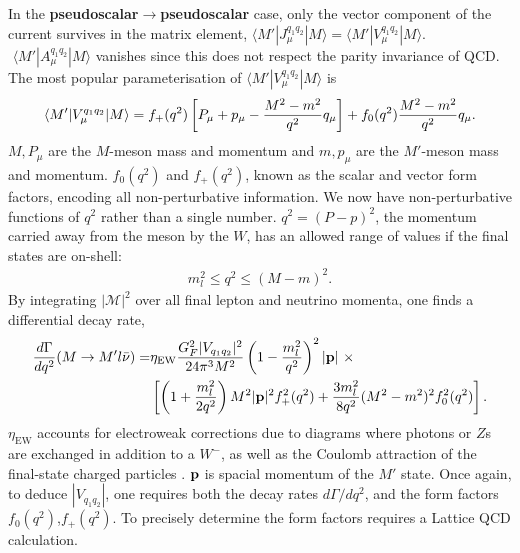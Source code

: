 In the {\bf{pseudoscalar$\to$pseudoscalar}} case, only the vector component of the current survives in the matrix element, $\langle M' | J_{\mu}^{q_1q_2} | M \rangle = \langle M' | V_{\mu}^{q_1q_2} | M \rangle$. $\,\,\langle M' | A_{\mu}^{q_1q_2} | M \rangle$ vanishes since this does not respect the parity invariance of QCD. The most popular parameterisation of $\langle M' | V_{\mu}^{q_1q_2} | M \rangle$ is
\begin{align}
  \langle M' | V_{\mu}^{q_1q_2} | M \rangle = f_+(q^2) \left[ P_{\mu} + p_{\mu} - {M^2-m^2\over q^2} q_{\mu} \right]  + f_0(q^2) {M^2-m^2\over q^2} q_{\mu}.
  \label{eq:formfactors_experimental}
\end{align}
$M,P_{\mu}$ are the $M$-meson mass and momentum and $m,p_{\mu}$ are the $M'$-meson mass and momentum. $f_0(q^2)$ and $f_+(q^2)$, known as the scalar and vector form factors, encoding all non-perturbative information. We now have non-perturbative functions of $q^2$ rather than a single number. $q^2=(P-p)^2$, the momentum carried away from the meson by the $W$, has an allowed range of values if the final states are on-shell:
\begin{align}
  m_l^2 \leq q^2 \leq (M-m)^2.
\end{align}
By integrating $|\mathcal{M}|^2$ over all final lepton and neutrino momenta, one finds a differential decay rate,
\begin{align}
  {d\Gamma\over dq^2}(M\to M'l\bar{\nu}) =& \eta_{\text{EW}} { G_F^2 |V_{q_1q_2}|^2\over 24 \pi^3 M^2 } \left( 1 - {m_l^2\over q^2}\right)^2 |{\bf{p}}| \,\,\times \\
  \label{eq:branchingfraction}
  &\left[ \left( 1 + {m_l^2\over 2q^2}\right) M^2 |{\bf{p}}|^2 f_+^2(q^2) + {3m_l^2\over 8q^2} (M^2-m^2)^2 f_0^2(q^2) \right]. \nonumber
\end{align}
${\eta}_{\text{EW}}$ accounts for electroweak corrections due to diagrams where photons or $Z$s are exchanged in addition to a $W^-$, as well as the Coulomb attraction of the final-state charged particles \cite{SIRLIN198283,Ginsberg1968,PhysRevD.41.1736}. ${\bf{p}}$ is spacial momentum of the $M'$ state. Once again, to deduce $|V_{q_1q_2}|$, one requires both the decay rates $d\Gamma/dq^2$, and the form factors $f_0(q^2)$,$f_+(q^2)$. To precisely determine the form factors requires a Lattice QCD calculation.

